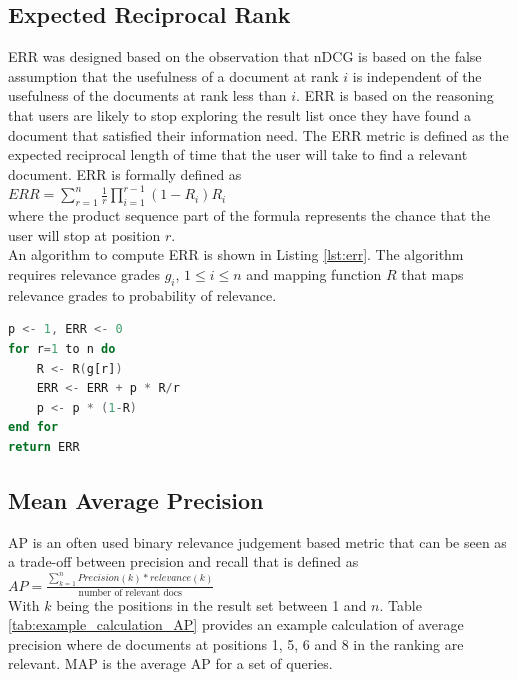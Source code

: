 \subsection{Expected Reciprocal Rank}
\ac{ERR} \cite{Chapelle2009} was designed based on the observation that \ac{nDCG} is based on the false assumption that the usefulness of a document at rank $i$ is independent of the usefulness of the documents at rank less than $i$. \ac{ERR} is based on the reasoning that users are likely to stop exploring the result list once they have found a document that satisfied their information need. The \ac{ERR} metric is defined as the expected reciprocal length of time that the user will take to find a relevant document. \ac{ERR} is formally defined as\\

$ERR = \sum\nolimits_{r=1}^n \frac{1}{r} \prod\nolimits_{i=1}^{r-1}(1-R_i)R_i$\\

where the product sequence part of the formula represents the chance that the user will stop at position $r$.\\
An algorithm to compute \ac{ERR} is shown in Listing \ref{lst:err}. The algorithm requires relevance grades $g_i$, $1 \le i \le n$ and mapping function $R$ that maps relevance grades to probability of relevance.
\begin{lstlisting}[caption={Algorithm to compute the \acs{ERR} metric, obtained from \cite{Chapelle2009}}, label={lst:err},language=Ada]
p <- 1, ERR <- 0
for r=1 to n do
	R <- R(g[r])
	ERR <- ERR + p * R/r
	p <- p * (1-R)
end for
return ERR
\end{lstlisting}
\subsection{Mean Average Precision}
\ac{AP} \cite{Zhu2004} is an often used binary relevance judgement based metric that can be seen as a trade-off between precision and recall that is defined as\\

$AP = \frac{\sum\nolimits_{k=1}^{n}Precision(k)*relevance(k)}{\text{number of relevant docs}}$\\

With $k$ being the positions in the result set between 1 and $n$. Table \ref{tab:example_calculation_AP} provides an example calculation of average precision where de documents at positions 1, 5, 6 and 8 in the ranking are relevant.
\ac{MAP} is the average \ac{AP} for a set of queries.\\

